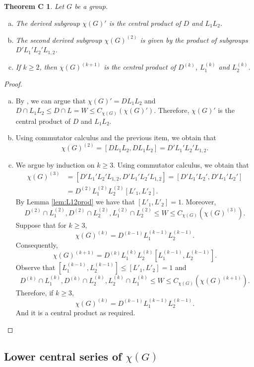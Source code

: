 \documentclass[12pt,leqno]{amsart}
\newtheorem*{thmC}{Theorem C}
\begin{document}
\begin{thmC}
Let $G$ be a group.   
\begin{enumerate}[(a)]
    \item The derived subgroup $\chi(G)'$ is the central product of  $D$ and  $L_1L_2$.
    \item The second derived subgroup $\chi(G)^{(2)}$ is given by the product of subgroups $D'L_1'L_2'L_{1,2}$.
    \item If $k \geq 2$, then $\chi(G)^{(k+1)}$ is the central product of $D^{(k)}$, $ L_1^{(k)}$ and $L_2^{(k)}$.
\end{enumerate}
\end{thmC}
\begin{proof} 
\begin{enumerate}[(a)]
    \item By \cite[Proposition 4.1.4]{Sidki}, we can argue that $\chi(G)'= D L_1 L_2$ and $D\cap L_1L_2\leq D\cap L=W\leq C_{\chi(G)}(\chi(G)')$. Therefore, $\chi(G)'$ is the central product of $D$ and $L_1 L_2$.
    \item Using commutator calculus and the previous item, we obtain that
    \[ 
    \chi(G)^{(2)}=[D L_1L_2,D L_1L_2]= D' L_1'L_2'L_{1,2}. 
    \]
    \item We argue by induction on $k\geq 3$. Using commutator calculus, we obtain that 
    \begin{align*}    
        \chi(G)^{(3)}&= [D' L_1'L_2'L_{1,2},D' L_1'L_2'L_{1,2}]=[D' L_1'L_2',D' L_1'L_2']\\
        &= D^{(2)}L_1^{(2)}L_2^{(2)} [L'_{1},L'_2]. 
    \end{align*}
    By Lemma \ref{lem:L12prod}  we have that $[L'_{1},L'_2]=1$. Moreover,
    \[
    D^{(2)}\cap L_1^{(2)},D^{(2)}\cap L_2^{(2)},L_1^{(2)}\cap L_2^{(2)}\leq W\leq C_{\chi(G)}(\chi(G)^{(3)}).
    \]
    Suppose that for $k\geq 3$,  
    \[
    \chi(G)^{(k)}= D^{(k-1)}L_1^{(k-1)}L_2^{(k-1)}. 
    \]
    Consequently,
    \[
    \chi(G)^{(k+1)}= D^{(k)}L_1^{(k)}L_2^{(k)} [L_1^{(k-1)},L_2^{(k-1)}]. 
    \]
    Observe that $[L_1^{(k-1)},L_2^{(k-1)}]\leq [L'_1,L'_2]=1$ and 
    \[
    D^{(k)}\cap L_1^{(k)},D^{(k)}\cap L_2^{(k)},L_2^{(k)}\cap L_1^{(k)}\leq W\leq C_{\chi(G)}(\chi(G)^{(k+1)}). 
    \]
    Therefore, if $k\geq 3$, 
    \[
    \chi(G)^{(k)}= D^{(k-1)}L_1^{(k-1)}L_2^{(k-1)}. 
    \]
    And it is a central product as required. \qedhere
\end{enumerate}
\end{proof}

\subsection{Lower central series of \texorpdfstring{$\chi(G)$}{χ(G)}}
\end{document}
